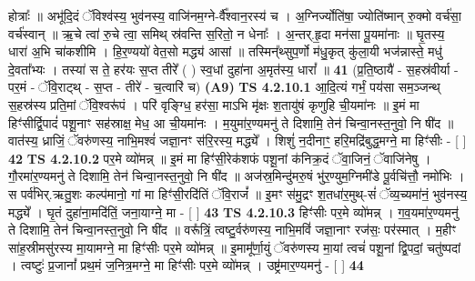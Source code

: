 \documentclass[17pt]{extarticle}
\begin{document}
                  होत्राः᳚ ॥ अभू॑दि॒दं ॅविश्व॑स्य॒ भुव॑नस्य॒ वाजि॑नम॒ग्ने-र्वै᳚श्वान॒रस्य॑ च । अ॒ग्निर्ज्योति॑षा॒ ज्योति॑ष्मान् रु॒क्मो वर्च॑सा॒ वर्च॑स्वान् ॥ ऋ॒चे त्वा॑ रु॒चे त्वा॒ समिथ् स्र॑वन्ति स॒रितो॒ न धेनाः᳚ । अ॒न्तर्.हृ॒दा मन॑सा पू॒यमा॑नाः ॥ घृ॒तस्य॒ धारा॑ अ॒भि चा॑कशीमि । हि॒र॒ण्ययो॑ वेत॒सो मद्ध्य॑ आसां ॥ तस्मिन्᳚थ्सुप॒र्णो म॑धु॒कृत् कु॑ला॒यी भज॑न्नास्ते॒ मधु॑ दे॒वता᳚भ्यः । तस्या॑ स ते॒ हर॑यः स॒प्त तीरे᳚ ( ) स्व॒धां दुहा॑ना अ॒मृत॑स्य॒ धारां᳚ ॥ \textbf{  41} \newline
                  \newline
                      (प्र॒ति॒ष्ठायै॑ - स॒हस्र॑वीर्या - पर॒मं - ॅवि॒राट्थ् - स॒प्त - तीरे॑ - च॒त्वारि॑ च)  \textbf{(A9)} \newline \newline
                                        \textbf{ TS 4.2.10.1} \newline
                  आ॒दि॒त्यं गर्भं॒ पय॑सा सम॒ञ्जन्थ् स॒हस्र॑स्य प्रति॒मां ॅवि॒श्वरू॑पं । परि॑ वृङ्ग्धि॒ हर॑सा॒ माऽभि मृ॑क्षः श॒तायु॑षं कृणुहि ची॒यमा॑नः ॥ इ॒मं मा हिꣳ॑सीर्द्वि॒पादं॑ पशू॒नाꣳ सह॑स्राक्ष॒ मेध॒ आ ची॒यमा॑नः । म॒युमा॑र॒ण्यमनु॑ ते दिशामि॒ तेन॑ चिन्वा॒नस्त॒नुवो॒ नि षी॑द ॥ वात॑स्य॒ ध्राजिं॒ ॅवरु॑णस्य॒ नाभि॒मश्वं॑ जज्ञा॒नꣳ स॑रि॒रस्य॒ मद्ध्ये᳚ । शिशुं॑ न॒दीनाꣳ॒॒ हरि॒मद्रि॑बुद्ध॒मग्ने॒ मा हिꣳ॑सीः - [  ] \textbf{  42} \newline
                  \newline
                                \textbf{ TS 4.2.10.2} \newline
                  पर॒मे व्यो॑मन्न् ॥ इ॒मं मा हिꣳ॑सी॒रेक॑शफं पशू॒नां क॑निक्र॒दं ॅवा॒जिनं॒ ॅवाजि॑नेषु । गौ॒रमा॑र॒ण्यमनु॑ ते दिशामि॒ तेन॑ चिन्वा॒नस्त॒नुवो॒ नि षी॑द ॥ अज॑स्र॒मिन्दु॑मरु॒षं भु॑र॒ण्युम॒ग्निमी॑डे पू॒र्वचि॑त्तौ॒ नमो॑भिः । स पर्व॑भिर्.ऋतु॒शः कल्प॑मानो॒ गां मा हिꣳ॑सी॒रदि॑तिं ॅवि॒राजं᳚ ॥ इ॒मꣳ स॑मु॒द्रꣳ श॒तधा॑र॒मुथ्-सं॑ ॅव्य॒च्यमा॑नं॒ भुव॑नस्य॒ मद्ध्ये᳚ । घृ॒तं दुहा॑ना॒मदि॑तिं॒ जना॒याग्ने॒ मा - [  ] \textbf{  43} \newline
                  \newline
                                \textbf{ TS 4.2.10.3} \newline
                  हिꣳ॑सीः पर॒मे व्यो॑मन्न् । ग॒व॒यमा॑र॒ण्यमनु॑ ते दिशामि॒ तेन॑ चिन्वा॒नस्त॒नुवो॒ नि षी॑द ॥ वरू᳚त्रिं॒ त्वष्टु॒र्वरु॑णस्य॒ नाभि॒मविं॑ जज्ञा॒नाꣳ रज॑सः॒ पर॑स्मात् । म॒हीꣳ सा॑ह॒स्रीमसु॑रस्य मा॒यामग्ने॒ मा हिꣳ॑सीः पर॒मे व्यो॑मन्न् ॥ इ॒मामू᳚र्णा॒युं ॅवरु॑णस्य मा॒यां त्वचं॑ पशू॒नां द्वि॒पदां॒ चतु॑ष्पदां । त्वष्टुः॑ प्र॒जानां᳚ प्रथ॒मं ज॒नित्र॒मग्ने॒ मा हिꣳ॑सीः पर॒मे व्यो॑मन्न् । उष्ट्र॑मार॒ण्यमनु॑ - [  ] \textbf{  44} \newline
\end{document}
